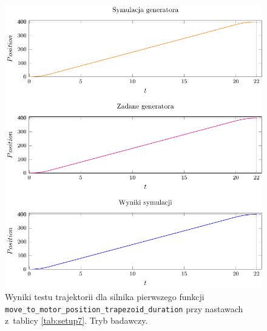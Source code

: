 \documentclass[a4paper, 12pt]{article}
\begin{document}
	\begin{figure}[H]
		\centering
		\includegraphics[scale=1.2]{raport_graphs/simpMPDR.pdf}
		\caption{Wyniki testu trajektorii dla silnika pierwszego funkcji \texttt{move\_to\_motor\_position\_trapezoid\_duration} przy nastawach z~tablicy \ref{tab:setup7}. Tryb badawczy.}
		\label{fig:simpMPDR}
	\end{figure}
\end{document}
